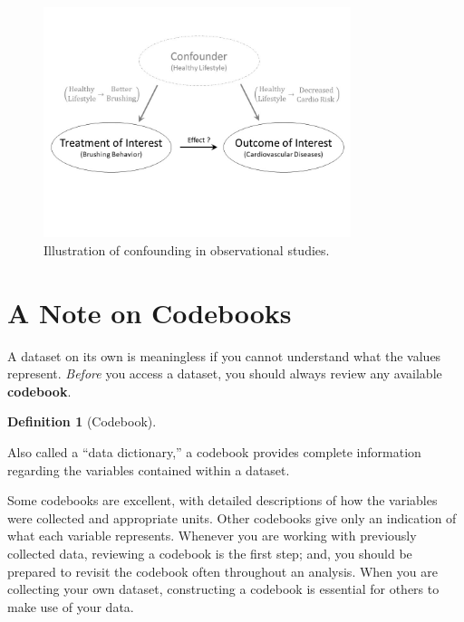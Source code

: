 \documentclass[
  letterpaper,
  DIV=11,
  numbers=noendperiod]{scrreprt}
\theoremstyle{definition}
\theoremstyle{definition}
\newtheorem{definition}{Definition}[chapter]
\theoremstyle{remark}
\begin{document}
\begin{figure}

{\centering \includegraphics[width=0.8\textwidth,height=\textheight]{images/Statistical-Process-Confounding.jpg}

}

\caption{\label{fig-statistical-process-confounding}Illustration of
confounding in observational studies.}

\end{figure}

\hypertarget{a-note-on-codebooks}{%
\section{A Note on Codebooks}\label{a-note-on-codebooks}}

A dataset on its own is meaningless if you cannot understand what the
values represent. \emph{Before} you access a dataset, you should always
review any available \textbf{codebook}.

\begin{definition}[Codebook]\protect\hypertarget{def-codebook}{}\label{def-codebook}

Also called a ``data dictionary,'' a codebook provides complete
information regarding the variables contained within a dataset.

\end{definition}

Some codebooks are excellent, with detailed descriptions of how the
variables were collected and appropriate units. Other codebooks give
only an indication of what each variable represents. Whenever you are
working with previously collected data, reviewing a codebook is the
first step; and, you should be prepared to revisit the codebook often
throughout an analysis. When you are collecting your own dataset,
constructing a codebook is essential for others to make use of your
data.
\end{document}
